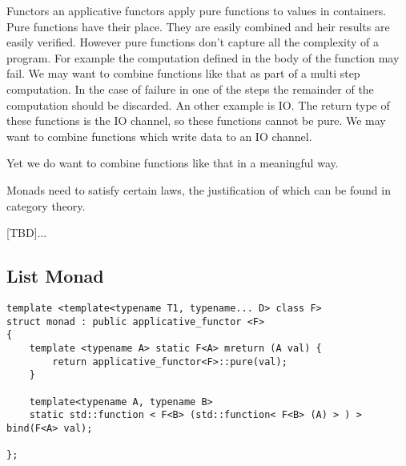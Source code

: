 \documentclass[12pt,fleqn]{article}
\begin{document}
Functors an applicative functors apply pure functions to values in containers.
Pure functions have their place. 
They are easily combined and heir results are easily verified.
However pure functions don't capture all the complexity of a program.
For example the computation defined in the body of the function may fail.
We may want to combine functions like that as part of a multi step computation. 
In the case of failure in one of the steps the remainder of the computation should be discarded.
An other example is IO.
The return type of these functions is the IO channel, so these functions cannot be pure.
We may want to combine functions which write data to an IO channel.

Yet we do want  to combine functions like that in a meaningful way. 

Monads need to satisfy certain laws, the justification of which can be found in category theory.

[TBD]...


\subsection*{List Monad}

\begin{lstlisting}[caption=monad defintion in C++, label=cppmonad]
template <template<typename T1, typename... D> class F> 
struct monad : public applicative_functor <F>
{
	template <typename A> static F<A> mreturn (A val) {
		return applicative_functor<F>::pure(val);
	}

	template<typename A, typename B>
	static std::function < F<B> (std::function< F<B> (A) > ) > bind(F<A> val);
	
};
\end{lstlisting}
\end{document}
